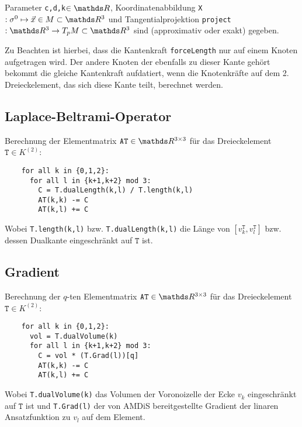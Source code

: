     Parameter \texttt{c,d,k}\( \in\R \), 
    Koordinatenabbildung \texttt{X}\(: \sigma^{0} \mapsto \vec{x}\in M \subset \R^{3} \) 
    und Tangentialprojektion \texttt{project}\(: \R^{3} \rightarrow T_{p}M \subset \R^{3} \)
    sind (approximativ oder exakt) gegeben.

    Zu Beachten ist hierbei, dass die Kantenkraft \texttt{forceLength} nur auf einem Knoten aufgetragen wird.
    Der andere Knoten der ebenfalls zu dieser Kante gehört bekommt die gleiche Kantenkraft aufdatiert, wenn die Knotenkräfte auf dem 2. Dreieckelement, das sich diese Kante teilt, berechnet
    werden.

    
  \subsection{Laplace-Beltrami-Operator}
    \label{subsecAlgoLBeltrami}
    Berechnung der Elementmatrix \( \mathtt{AT}\in\R^{3\times 3} \) für das Dreieckelement
    \( \mathtt{T}\in K^{(2)} \):
    \begin{verbatim}
    for all k in {0,1,2}:
      for all l in {k+1,k+2} mod 3:
        C = T.dualLength(k,l) / T.length(k,l)
        AT(k,k) -= C
        AT(k,l) += C
    \end{verbatim}
    Wobei \texttt{T.length(k,l)} bzw. \texttt{T.dualLength(k,l)} die Länge von
    \( \left[ v^{\mathtt{T}}_{k} , v^{\mathtt{T}}_{l} \right] \) bzw. dessen Dualkante eingeschränkt auf \(
   \mathtt{T} \) ist.

  \subsection{Gradient}
    \label{subsecAlgoGradient}
    Berechnung der \( q \)-ten Elementmatrix \( \mathtt{AT}\in\R^{3\times 3} \) für das Dreieckelement
    \( \mathtt{T}\in K^{(2)} \):
    \begin{verbatim}
    for all k in {0,1,2}:
      vol = T.dualVolume(k)
      for all l in {k+1,k+2} mod 3:
        C = vol * (T.Grad(l))[q]
        AT(k,k) -= C
        AT(k,l) += C
    \end{verbatim}
    Wobei \texttt{T.dualVolume(k)} das Volumen der Voronoizelle der Ecke \( v_{k} \) eingeschränkt auf \(
   \mathtt{T} \) ist und \texttt{T.Grad(l)} der von AMDiS bereitgestellte Gradient der linaren Ansatzfunktion zu \( v_{l} \)
   auf dem Element.

